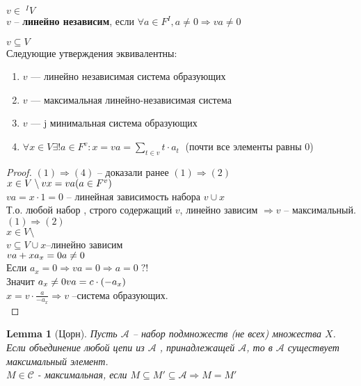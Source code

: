 \documentclass[11pt]{book}
\theoremstyle{definition}
\theoremstyle{plain}
\theoremstyle{plain}
\newtheorem*{lm}{Lemma}
\theoremstyle{definition}
\theoremstyle{remark}
\begin{document}
\begin{defn}
$v \in \;^I  V$\\
$v$ -- {\bf линейно независим}, если $\forall a \in F^I, a \neq 0 \Rightarrow v a  \neq  0$\\
\end{defn}

\begin{thm}
    $v \subseteq V $ \\
Следующие утверждения эквивалентны:
\begin{enumerate}
    \item $v$ --- линейно независимая система образующих
    \item $v$ --- максимальная линейно-независимая система
    \item $v$ --- j минимальная система образующих
    \item $\forall x \in V \exists! a \in F^v : x = v a = \sum\limits_{t \in v} t \cdot a_t  \;$ (почти все элементы равны 0)
\end{enumerate}
\end{thm}

\begin{proof}
$(1) \Rightarrow (4) $ -- доказали ранее
$(1) \Rightarrow (2) $\\
$x \in V \setminus  v \\ x = v a (a \in F^v)$\\
$v a = x \cdot 1 = 0$ -- линейная зависимость набора $v \cup {x}$\\
Т.о. любой набор , строго содержащий $v$, линейно зависим $\Rightarrow v$ -- максимальный.
\\
$(1)\Rightarrow(2) $\\
$x \in V \setminus $\\
$v \subseteq V \cup {x} $--линейно зависим\\
$va + x a_x = 0 \\ a \ne 0$\\
Если $a_x = 0 \Rightarrow va = 0 \Rightarrow a = 0 \; ?!$\\
Значит $a_x \ne 0 \\ va = c\cdot (-a_x)$\\
$x = v \cdot \frac{a}{-a_x} \Rightarrow v$ --система образующих.\\
\end{proof}

\begin{lm}[Цорн]
Пусть $\mathcal A $ -- набор подмножеств (не всех) множества $X$. \\
Если объединение любой цепи из $\mathcal A$ , принадлежащей $\mathcal A$, то в $\mathcal A$ существует максимальный элемент.\\
$M \in \mathcal C$ - максимальная, если $M \subseteq M' \subseteq \mathcal A \Rightarrow M =M'$\\
\end{lm}
\end{document}
